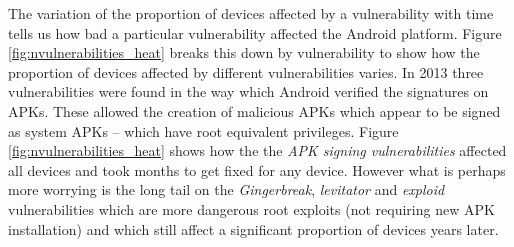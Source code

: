 \documentclass[conference,a4paper,twoside]{IEEEtran}
\begin{document}
The variation of the proportion of devices affected by a vulnerability with time tells us how bad a particular vulnerability affected the Android platform.
Figure \ref{fig:nvulnerabilities_heat} breaks this down by vulnerability to show how the proportion of devices affected by different vulnerabilities varies.
In 2013 three vulnerabilities were found in the way which Android verified the signatures on APKs.
These allowed the creation of malicious APKs which appear to be signed as system APKs -- which have root equivalent privileges.
Figure \ref{fig:nvulnerabilities_heat} shows how the the \emph{APK signing vulnerabilities} affected all devices and took months to get fixed for any device.
However what is perhaps more worrying is the long tail on the \emph{Gingerbreak}, \emph{levitator} and \emph{exploid} vulnerabilities which are more dangerous root exploits (not requiring new APK installation) and which still affect a significant proportion of devices years later.
\end{document}
